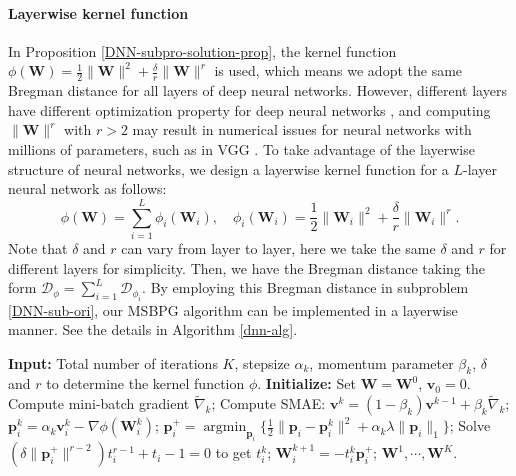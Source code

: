\documentclass[twoside,11pt]{article}
\newcommand{\be}{\begin{equation}}
\newcommand{\ee}{\end{equation}}
\newcommand{\cD}{\mathcal D}
\DeclareMathOperator*{\argmin}{argmin}
\def\vp{{\bm{p}}}
\def\vv{{\bm{v}}}
\def\mW{{\bm{W}}}
\begin{document}
\paragraph{Layerwise kernel function}
In Proposition \ref{DNN-subpro-solution-prop}, the kernel function $\phi({\mW})=\frac{1}{2}\|{\mW}\|^2+\frac{\delta}{r}\|{\mW}\|^{r}$ is used, which means we adopt the same Bregman distance for all layers of deep neural networks. However, different layers have different optimization property for deep neural networks \citep{you2019large}, and computing $\|\mW\|^r$ with $r>2$ may result in numerical issues for neural networks with millions of parameters, such as in VGG \citep{simonyan2014very}.
To take advantage of the layerwise structure of neural networks, we design a layerwise kernel function for a $L$-layer neural network as follows:
\be
\phi({\mW})=\sum_{i=1}^L\phi_i({\mW}_i),\quad \phi_i({\mW}_i)=\frac{1}{2}\|{\mW}_i\|^2+\frac{\delta}{r}\|{\mW}_i\|^{r}.
\label{kernel-nn}
\ee
Note that $\delta$ and $r$ can vary from layer to layer, here we take the same $\delta$ and $r$ for different layers for simplicity.
Then, we have the Bregman distance taking the form $\cD_\phi=\sum_{i=1}^L\cD_{\phi_i}$. By employing this Bregman distance in subproblem \eqref{DNN-sub-ori}, our MSBPG  algorithm can be implemented in a layerwise manner. See the details in Algorithm \ref{dnn-alg}.

\begin{algorithm}[ht] 
    \caption{Momentum based Stochastic Bregman Proximal Gradient (MSBPG) for training neural networks}
    \begin{algorithmic}[1]
        \State \textbf{Input: }Total number of iterations $K$, stepsize $\alpha_k$, momentum parameter $\beta_k$, $\delta$ and $r$ to determine the kernel function $\phi$.
        \State \textbf{Initialize: }Set $\mW=\mW^0$, $\vv_0=0$.
        \State Compute mini-batch gradient $\widetilde\nabla_k$;
        \State Compute SMAE: $\vv^k=(1-\beta_k)\vv^{k-1}+\beta_k\widetilde\nabla_k$;
        \State $\vp_i^k = \alpha_k \vv_i^k - \nabla\phi(\mW^{k}_i)$;
        \State $\vp_i^+ = \argmin_{\vp_i}\{\frac{1}{2}\|\vp_i-\vp_i^k\|^2+\alpha_k\lambda\|\vp_i\|_1\}$;
        \State Solve $(\delta \|\vp^+_i\|^{r-2})t_i^{r-1} + t_i -1 =0$ to get $t_i^k$;
        \State $\mW_i^{k+1} = - t_i^k \vp_i^+$;
        \EndFor
        \EndFor
        $\mW^1, \cdots, \mW^K$.
    \end{algorithmic}\label{dnn-alg}
\end{algorithm}
\end{document}
